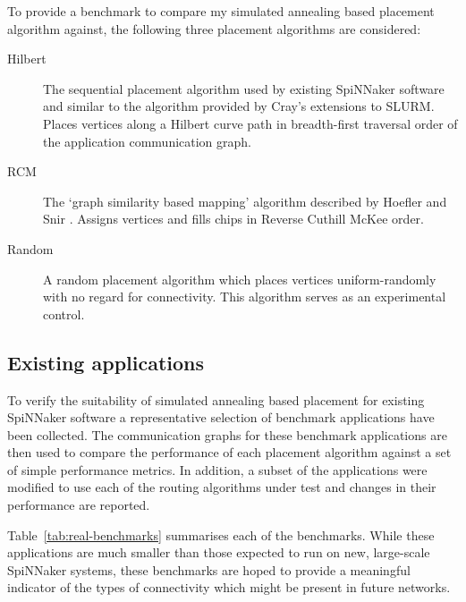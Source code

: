 			To provide a benchmark to compare my simulated annealing based placement
			algorithm against, the following three placement algorithms are
			considered:
			
			\begin{description}
				
				\item[Hilbert] The sequential placement algorithm used by existing
				SpiNNaker software and similar to the algorithm provided by Cray's
				extensions to SLURM. Places vertices along a Hilbert curve path in
				breadth-first traversal order of the application communication graph.
				
				\item[RCM] The `graph similarity based mapping' algorithm described by
				Hoefler and Snir \cite{hoefler11}. Assigns vertices and fills chips in
				Reverse Cuthill McKee order.
				
				\item[Random] A random placement algorithm which places vertices
				uniform-randomly with no regard for connectivity. This algorithm serves
				as an experimental control.
				
			\end{description}
			
		\subsection{Existing applications}
			
			\label{sec:existing-applications}
			
			To verify the suitability of simulated annealing based placement for
			existing SpiNNaker software a representative selection of benchmark
			applications have been collected. The communication graphs for these
			benchmark applications are then used to compare the performance of each
			placement algorithm against a set of simple performance metrics. In
			addition, a subset of the applications were modified to use each of the
			routing algorithms under test and changes in their performance are
			reported.
			
			Table~\ref{tab:real-benchmarks} summarises each of the benchmarks. While
			these applications are much smaller than those expected to run on new,
			large-scale SpiNNaker systems, these benchmarks are hoped to provide a
			meaningful indicator of the types of connectivity which might be present
			in future networks.
			
